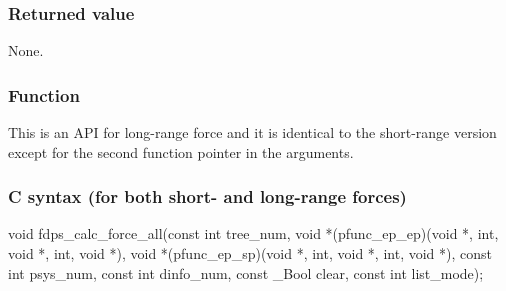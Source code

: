 \subsubsection*{Returned value}
None.

\subsubsection*{Function}
This is an API for long-range force and it is identical to the short-range version except for the second function pointer in the arguments.
\clearpage


\subsubsection*{C syntax (for both short- and long-range forces)}
\begin{screen}
\begin{spverbatim}
void fdps_calc_force_all(const int tree_num,
                         void *(pfunc_ep_ep)(void *, int, void *, int, void *),
                         void *(pfunc_ep_sp)(void *, int, void *, int, void *),
                         const int psys_num,
                         const int dinfo_num,
                         const _Bool clear,
                         const int list_mode);
\end{spverbatim}
\end{screen}


